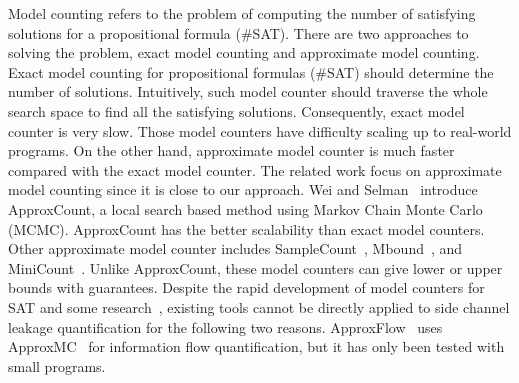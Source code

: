 Model counting refers to the problem of computing the number of satisfying
solutions for a propositional formula (\#SAT). There are two approaches to
solving the problem, exact model counting and approximate model
counting. Exact model counting for propositional formulas (\#SAT) should determine
the number of solutions. Intuitively, such model counter should traverse the whole
search space to find all the satisfying solutions. Consequently, exact model counter is 
very slow. Those model counters have difficulty scaling up to real-world programs.
On the other hand, approximate model counter is much faster compared with the exact 
model counter. The related work focus on approximate model counting since it is close to our approach. Wei and Selman~\cite{wei2005new} introduce
ApproxCount, a local search based method using Markov Chain Monte
Carlo (MCMC). ApproxCount has the better scalability than
exact model counters. Other approximate model counter includes
SampleCount~\cite{gomes2007sampling},
Mbound~\cite{gomes2006model}, and MiniCount~\cite{kroc2008leveraging}.
Unlike ApproxCount, these model counters can give lower or upper bounds with guarantees.
Despite the rapid development of model counters for SAT and some
research~\cite{chistikov2017approximate,phan2015model}, existing tools cannot be directly applied to side channel leakage quantification for the following two reasons.
ApproxFlow~\cite{biondi2018scalable} uses ApproxMC~\cite{chakraborty2016algorithmic} for information flow quantification, but it has only been tested with small programs.
